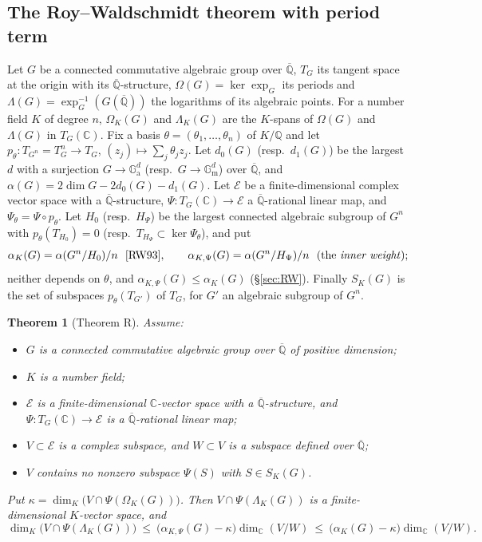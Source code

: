 \documentclass[11pt]{amsart}
\newtheorem{theorem}{Theorem}[section]
\theoremstyle{definition}
\newcommand{\Qb}{\overline{\mathbb{Q}}}
\newcommand{\C}{\mathbb{C}}
\newcommand{\Q}{\mathbb{Q}}
\newcommand{\Ga}{\mathbb{G}_{\mathrm a}}
\newcommand{\Gm}{\mathbb{G}_{\mathrm m}}
\newcommand{\cE}{\mathcal{E}}
\begin{document}
\subsection*{The Roy--Waldschmidt theorem with period term}
Let $G$ be a connected commutative algebraic group over $\Qb$, $T_G$ its tangent space at the origin with its
$\Qb$-structure, $\Omega(G)=\ker\exp_G$ its periods and $\Lambda(G)=\exp_G^{-1}(G(\Qb))$ the logarithms of its algebraic
points. For a number field $K$ of degree $n$, $\Omega_K(G)$ and $\Lambda_K(G)$ are the $K$-spans of $\Omega(G)$ and
$\Lambda(G)$ in $T_G(\C)$. Fix a basis $\theta=(\theta_1,\dots,\theta_n)$ of $K/\Q$ and let
$p_\theta\colon T_{G^n}=T_G^n\to T_G$, $(z_j)\mapsto\sum_j\theta_jz_j$. Let $d_0(G)$ (resp.\ $d_1(G)$) be the largest $d$ with a
surjection $G\to\Ga^d$ (resp.\ $G\to\Gm^d$) over $\Qb$, and $\alpha(G)=2\dim G-2d_0(G)-d_1(G)$. Let $\cE$ be a
finite-dimensional complex vector space with a $\Qb$-structure, $\Psi\colon T_G(\C)\to\cE$ a $\Qb$-rational linear map, and
$\Psi_\theta=\Psi\circ p_\theta$. Let $H_0$ (resp.\ $H_\Psi$) be the largest connected algebraic subgroup of $G^n$ with
$p_\theta(T_{H_0})=0$ (resp.\ $T_{H_\Psi}\subset\ker\Psi_\theta$), and put
\[
\alpha_K(G)=\alpha(G^n/H_0)/n\ \ \text{\cite[p.~360]{RW93}},\qquad \alpha_{K,\Psi}(G)=\alpha(G^n/H_\Psi)/n\ \ \text{(the
\emph{inner weight})};
\]
neither depends on $\theta$, and $\alpha_{K,\Psi}(G)\le\alpha_K(G)$ (\S\ref{sec:RW}). Finally $S_K(G)$ is the set of
subspaces $p_\theta(T_{G'})$ of $T_G$, for $G'$ an algebraic subgroup of $G^n$.

\begin{theorem}[Theorem R]\label{thm:R}
Assume:
\begin{itemize}
\item[(G)] $G$ is a connected commutative algebraic group over $\Qb$ of positive dimension;
\item[(K)] $K$ is a number field;
\item[($\Psi$)] $\cE$ is a finite-dimensional $\C$-vector space with a $\Qb$-structure, and $\Psi\colon T_G(\C)\to\cE$ is a
$\Qb$-rational linear map;
\item[(V)] $V\subset\cE$ is a complex subspace, and $W\subset V$ is a subspace defined over $\Qb$;
\item[(i)] $V$ contains no nonzero subspace $\Psi(S)$ with $S\in S_K(G)$.
\end{itemize}
Put $\kappa=\dim_K\bigl(V\cap\Psi(\Omega_K(G))\bigr)$. Then $V\cap\Psi(\Lambda_K(G))$ is a finite-dimensional $K$-vector
space, and
\[
\dim_K\bigl(V\cap\Psi(\Lambda_K(G))\bigr)\ \le\ \bigl(\alpha_{K,\Psi}(G)-\kappa\bigr)\dim_\C(V/W)\ \le\
\bigl(\alpha_K(G)-\kappa\bigr)\dim_\C(V/W).
\]
\end{theorem}
\end{document}
